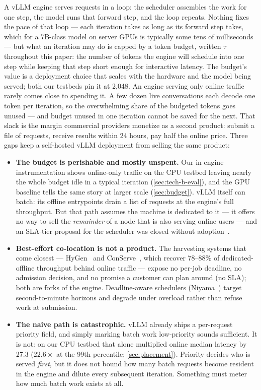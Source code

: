 \documentclass[11pt]{article}
\begin{document}
A vLLM engine serves requests in a loop: the scheduler assembles the work for one step,
the model runs that forward step, and the loop repeats. Nothing fixes the pace of that loop
--- each iteration takes as long as its forward step takes, which for a 7B-class model
on server GPUs is typically some tens of milliseconds --- but what an iteration may do
is capped by a token budget, written $\tau$ throughout this paper: the number of tokens
the engine will schedule into one step while keeping that step short enough for
interactive latency. The budget's value is a deployment choice that scales with the
hardware and the model being served; both our testbeds pin it at 2{,}048. An
engine serving only online traffic rarely comes close to spending it. A few dozen live
conversations each decode one token per iteration, so the overwhelming share of the
budgeted tokens goes unused --- and budget unused in one iteration cannot be saved for
the next. That slack is the margin commercial providers monetize as a second product:
submit a file of requests, receive results within 24 hours, pay half the online price.
Three gaps keep a self-hosted vLLM deployment from selling the same product:

\begin{itemize}\itemsep2pt
  \item \textbf{The budget is perishable and mostly unspent.} Our in-engine
    instrumentation shows online-only traffic on the CPU testbed leaving nearly the
    whole budget idle in a typical iteration (\cref{sec:tech-b-eval}), and the GPU
    baseline tells the same story at larger scale (\cref{sec:budget}). vLLM itself can batch: its offline entrypoints drain a
    list of requests at the engine's full throughput. But that path assumes the machine
    is dedicated to it --- it offers no way to sell the \emph{remainder} of a node that
    is also serving online users --- and an SLA-tier proposal for the scheduler was closed
    without adoption~\citep{vllm-rfc-30256}.
  \item \textbf{Best-effort co-location is not a product.} The harvesting systems that
    come closest --- HyGen~\citep{hygen} and ConServe~\citep{conserve}, which recover
    78--88\% of dedicated-offline throughput behind online traffic --- expose no per-job
    deadline, no admission decision, and no promise a customer can plan around
    (no SLA); both are forks of the engine. Deadline-aware schedulers
    (Niyama~\citep{niyama}) target second-to-minute horizons and degrade under overload
    rather than refuse work at submission.
  \item \textbf{The naive path is catastrophic.} vLLM already ships a per-request
    priority field, and simply marking batch work low-priority sounds sufficient. It is
    not: on our CPU testbed that alone multiplied online median latency by 27.3
    ($22.6\times$ at the 99th percentile; \cref{sec:placement}). Priority decides who is
    served \emph{first}, but it does not bound how many batch requests become resident
    in the engine and dilute every subsequent iteration. Something must meter how much
    batch work exists at all.
\end{itemize}
\end{document}
